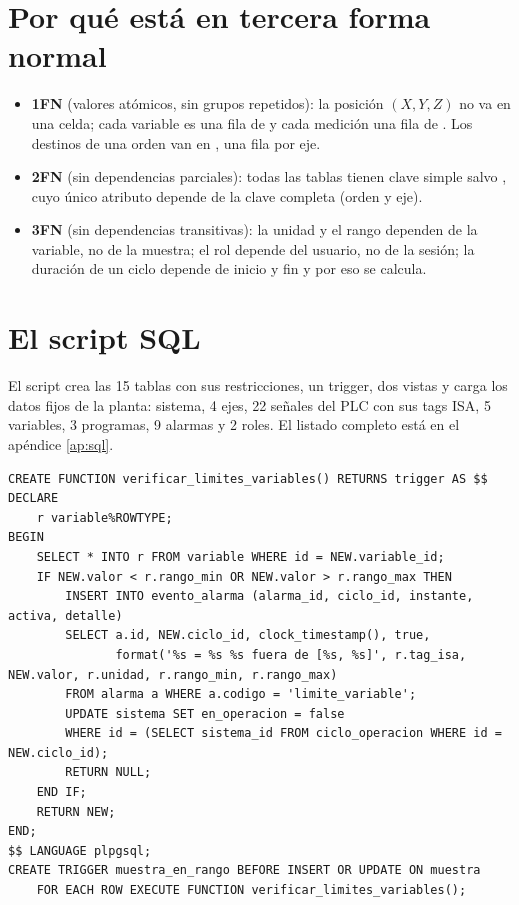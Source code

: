 \section{Por qué está en tercera forma normal}
\begin{itemize}
\item \textbf{1FN} (valores atómicos, sin grupos repetidos): la posición $(X, Y, Z)$ no va en una celda; cada variable es una fila de  y cada medición una fila de . Los destinos de una orden van en , una fila por eje.
\item \textbf{2FN} (sin dependencias parciales): todas las tablas tienen clave simple salvo , cuyo único atributo  depende de la clave completa (orden y eje).
\item \textbf{3FN} (sin dependencias transitivas): la unidad y el rango dependen de la variable, no de la muestra; el rol depende del usuario, no de la sesión; la duración de un ciclo depende de inicio y fin y por eso se calcula.
\end{itemize}

\section{El script SQL}
El script  crea las 15 tablas con sus restricciones, un trigger, dos vistas y carga los datos fijos de la planta: sistema, 4 ejes, 22 señales del PLC con sus tags ISA, 5 variables, 3 programas, 9 alarmas y 2 roles. El listado completo está en el apéndice \ref{ap:sql}.

\begin{lstlisting}[style=sql, caption={Trigger de seguridad: descarta la muestra fuera de rango, registra la alerta y saca la planta de operación (guías 1 y 5).}]
CREATE FUNCTION verificar_limites_variables() RETURNS trigger AS $$
DECLARE
    r variable%ROWTYPE;
BEGIN
    SELECT * INTO r FROM variable WHERE id = NEW.variable_id;
    IF NEW.valor < r.rango_min OR NEW.valor > r.rango_max THEN
        INSERT INTO evento_alarma (alarma_id, ciclo_id, instante, activa, detalle)
        SELECT a.id, NEW.ciclo_id, clock_timestamp(), true,
               format('%s = %s %s fuera de [%s, %s]', r.tag_isa, NEW.valor, r.unidad, r.rango_min, r.rango_max)
        FROM alarma a WHERE a.codigo = 'limite_variable';
        UPDATE sistema SET en_operacion = false
        WHERE id = (SELECT sistema_id FROM ciclo_operacion WHERE id = NEW.ciclo_id);
        RETURN NULL;
    END IF;
    RETURN NEW;
END;
$$ LANGUAGE plpgsql;
CREATE TRIGGER muestra_en_rango BEFORE INSERT OR UPDATE ON muestra
    FOR EACH ROW EXECUTE FUNCTION verificar_limites_variables();
\end{lstlisting}

